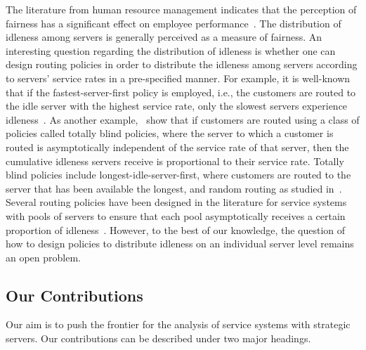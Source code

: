 \documentclass[a4paper,11pt,twoside]{article}
\numberwithin{equation}{section}
\numberwithin{figure}{section}
\theoremstyle{plain}
\newcommand{\1}{\mathbbm{1}}
\begin{document}
The literature from human resource management indicates that the perception of fairness has a significant effect on employee performance~\cites{colquittetal2001,cohencharash2001}. The distribution of idleness among servers is generally perceived as a measure of fairness. An interesting question regarding the distribution of idleness is whether one can design routing policies in order to distribute the idleness among servers according to servers' service rates in a pre-specified manner. For example, it is well-known that if the fastest-server-first policy is employed, i.e., the customers are routed to the idle server with the highest service rate, only the slowest servers experience idleness~\cites{Armony2005, Atar2008, bukeqin2019}. As another example,~\cite{bukeqin2019} show that if customers are routed using a class of policies called totally blind policies, where the server to which a customer is routed is asymptotically independent of the service rate of that server, then the cumulative idleness servers receive is proportional to their service rate. Totally blind policies include longest-idle-server-first, where customers are routed to the server that has been available the longest, and random routing as studied in~\cite{Gumbel1960}. Several routing policies have been designed in the literature for service systems with pools of servers to ensure that each pool asymptotically receives a certain proportion of idleness~\cites{Armony2005, atarschwartzshaki11, armward10, gurwhitt09, reedshaki2015, wararm13}. However, to the best of our knowledge, the question of how to design policies to distribute idleness on an individual server level remains an open problem. 




\subsection{Our Contributions}\label{sec:contributions}

Our aim is to push the frontier for the analysis of service systems with strategic servers. Our contributions can be described under two major headings.
\end{document}
